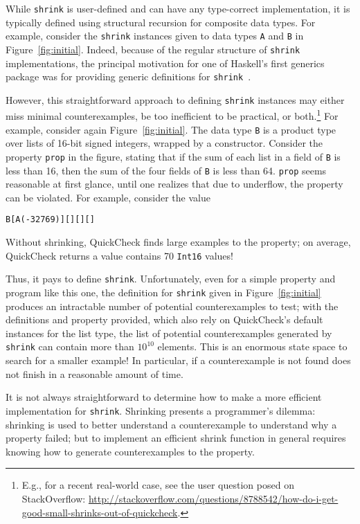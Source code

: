 \documentclass[10pt]{sigplanconf}
\newenvironment{code}{\begin{alltt}}{\end{alltt}}
\newcommand{\ttp}[1]{\texttt{#1}}
\begin{document}
While \ttp{shrink} is user-defined and can have any type-correct implementation,
it is typically defined using structural recursion for composite data types.
For example, consider the \ttp{shrink} instances given to data types \ttp{A} and
\ttp{B} in Figure~\ref{fig:initial}.  Indeed, because of the regular structure
of \ttp{shrink} implementations, the principal motivation for one
of Haskell's first generics package was for providing generic definitions for
\ttp{shrink}~\cite{syb}.

However, this straightforward approach to defining \ttp{shrink} instances may
either miss minimal counterexamples, be too inefficient to be practical, or
both.\footnote{E.g., for a recent real-world case, see the user question posed on StackOverflow:
  \url{http://stackoverflow.com/questions/8788542/how-do-i-get-good-small-shrinks-out-of-quickcheck}.}
For example, consider again Figure~\ref{fig:initial}.  The data type \ttp{B} is
a product type over lists of 16-bit signed integers, wrapped by a constructor.
Consider the property \ttp{prop} in the figure, stating that if the sum of each
list in a field of \ttp{B} is less than 16, then the sum of the four fields of
\ttp{B} is less than 64.  \ttp{prop} seems reasonable at first glance, until
one realizes that due to underflow, the property can be violated.  For example,
consider the value
%
\begin{code}
B [A (-32769)] [] [] []
\end{code}
%
\noindent
Without shrinking, QuickCheck finds large examples to the property; on average,
QuickCheck returns a value contains 70 \ttp{Int16} values!

Thus, it pays to define \ttp{shrink}.  Unfortunately, even for a simple property
and program like this one, the definition for \ttp{shrink} given in
Figure~\ref{fig:initial} produces an intractable number of potential
counterexamples to test; with the definitions and property provided, which also
rely on QuickCheck's default instances for the list type, the list of potential
counterexamples generated by \ttp{shrink} can contain more than $10^{10}$
elements.  This is an enormous state space to search for a smaller example!  In
particular, if a counterexample is not found does not finish in a reasonable
amount of time.

It is not always straightforward to determine how to make a more efficient
implementation for \ttp{shrink}.  Shrinking presents a programmer's dilemma:
shrinking is used to better understand a counterexample to understand why a
property failed; but to implement an efficient shrink function in general
requires knowing how to generate counterexamples to the property.
\end{document}
